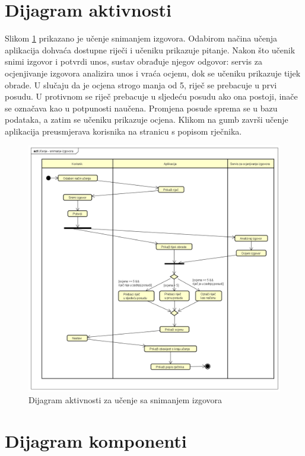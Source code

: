 \eject


\section{Dijagram aktivnosti}

Slikom \ref{fig:aktivnosti-izgovor} prikazano je učenje snimanjem izgovora. Odabirom načina učenja aplikacija dohvaća dostupne riječi i učeniku prikazuje pitanje. Nakon što učenik snimi izgovor i potvrdi unos, sustav obrađuje njegov odgovor: servis za ocjenjivanje izgovora analizira unos i vraća ocjenu, dok se učeniku prikazuje tijek obrade. U slučaju da je ocjena strogo manja od 5, riječ se prebacuje u prvi posudu. U protivnom se riječ prebacuje u sljedeću posudu ako ona postoji, inače se označava kao u potpunosti naučena. Promjena posude sprema se u bazu podataka, a zatim se učeniku prikazuje ocjena. Klikom na gumb završi učenje aplikacija preusmjerava korisnika na stranicu s popisom rječnika.
	
\begin{figure}[htp]
\includegraphics[scale=0.4]{dijagrami/aktivnosti.png}
\centering
\caption{Dijagram aktivnosti za učenje sa snimanjem izgovora}
\label{fig:aktivnosti-izgovor}
\end{figure}


	\eject
\section{Dijagram komponenti}

